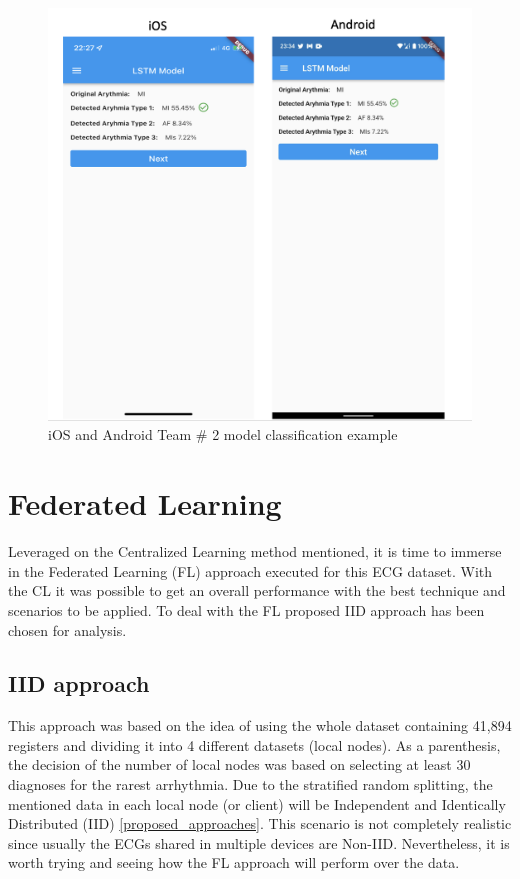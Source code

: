 \begin{figure}[H]
\centering
\includegraphics[scale=0.4]{img/lstm_deployment.png}
\caption{iOS and Android Team \# 2 model classification example}
\label{dnn_deloyment}
\end{figure}




\section{Federated Learning} \label{5FL}

Leveraged on the Centralized Learning method mentioned, it is time to immerse in the Federated Learning (FL) approach executed for this ECG dataset. With the CL it was possible to get an overall performance with the best technique and scenarios to be applied. To deal with the FL proposed IID approach has been chosen for analysis. 

\subsection{IID approach}

This approach was based on the idea of using the whole dataset containing 41,894 registers and dividing it into 4 different datasets (local nodes). As a parenthesis, the decision of the number of local nodes was based on selecting at least 30 diagnoses for the rarest arrhythmia. Due to the stratified random splitting, the mentioned data in each local node (or client) will be Independent and Identically Distributed (IID) \ref{proposed_approaches}. This scenario is not completely realistic since usually the ECGs shared in multiple devices are Non-IID. Nevertheless, it is worth trying and seeing how the FL approach will perform over the data.

